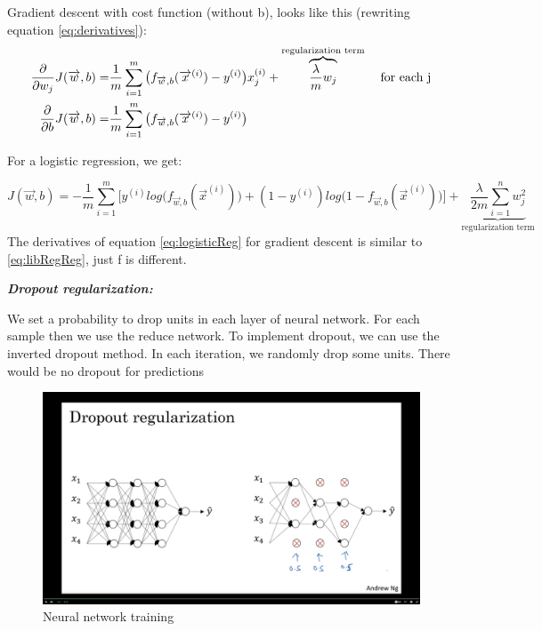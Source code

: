 \documentclass[12pt]{report}
\begin{document}
Gradient descent with cost function (without b), looks like this (rewriting equation \ref{eq:derivatives}):
\begin{equation}
\label{eq:libRegReg}
  \begin{split}
    \frac{\partial}{\partial w_j} J(\overrightarrow{w},b) =&  \frac{1}{m} \sum_{i=1}^{m} \big( f_{\overrightarrow{w},b} (\overrightarrow{x}^{(i)}) - y^{(i)} \big) x_j^{(i)} + \overbrace{\frac{\lambda}{m} w_j}^\text{regularization term} \text{\: \: for each j} \\
    \frac{\partial}{\partial b} J(\overrightarrow{w},b)   =& \frac{1}{m} \sum_{i=1}^{m} \big( f_{\overrightarrow{w},b} (\overrightarrow{x}^{(i)})  - y^{(i)} \big)
  \end{split}
\end{equation}

For a logistic regression, we get:

\begin{equation}
  J(\overrightarrow{w},b)   = -\frac{1}{m} \sum_{i=1}^{m} \big[ y^{(i)} log\big( f_{\overrightarrow{w},b} (\overrightarrow{x}^{(i)}) \big) + (1-y^{(i)}) log\big(1-f_{\overrightarrow{w},b} (\overrightarrow{x}^{(i)}) \big)  \big]+ \underbrace{ \frac{\lambda}{2m} \sum_{i=1}^n w_j^2}_\text{regularization term}
\label{eq:logisticReg}
\end{equation}
The derivatives of equation \ref{eq:logisticReg} for gradient descent is similar to \ref{eq:libRegReg}, just f is different.


\textbf{\textit{Dropout regularization:}}

We set a probability to drop units in each layer of neural network. For each sample then we use the reduce network. To implement dropout, we can use the inverted dropout method. In each iteration, we randomly drop some units. There would be no dropout for predictions

\begin{figure}[H]
  \centering
  \includegraphics[trim =3.0cm 2.0cm 3.0cm 2.0cm, clip, scale=0.12]{pics/dropoutregularization.png}
  \caption{Neural network training}
\end{figure}
\end{document}
